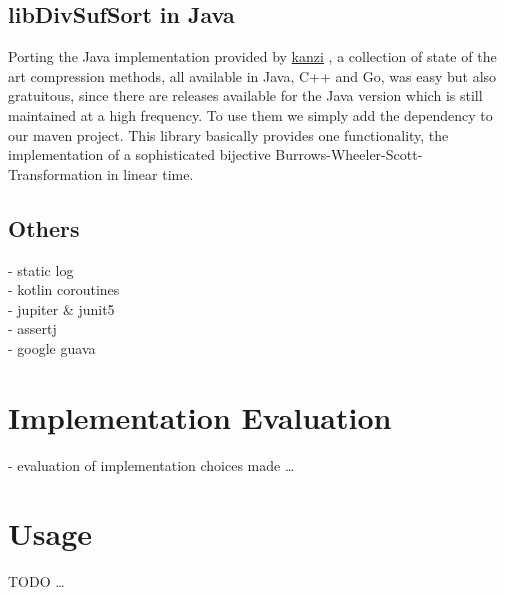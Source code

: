 \subsection{libDivSufSort in Java}
\label{ch:Implementation:sec:Impl:subsec:libs:libDivSufSort Java}
\par{
Porting the Java implementation provided by \href{https://github.com/flanglet/kanzi/releases}{kanzi} \cite{kanzi}, a collection of state of the art compression methods, all available in Java, C++ and Go, was easy but also gratuitous, since there are releases available for the Java version which is still maintained at a high frequency. To use them we simply add the dependency to our maven project. This library basically provides one functionality, the implementation of a sophisticated bijective Burrows-Wheeler-Scott-Transformation in linear time.
}
\par{

}

\subsection{Others}
\label{ch:Implementation:sec:Impl:subsec:libs:others}
- static log\\
- kotlin coroutines\\
- jupiter \& junit5\\
- assertj\\
- google guava\\


\section{Implementation Evaluation}
\label{ch:Implementation:sec:Implementation Evaluation}
- evaluation of implementation choices made
\ldots


\section{Usage}
\label{ch:Implementation:sec:usage}
TODO
\ldots
